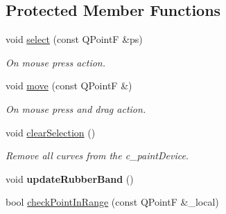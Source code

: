 \subsection*{Protected Member Functions}
\begin{DoxyCompactItemize}
\item 
\mbox{\label{classLineTool_a0262637a5a466947883468e740fda29c}} 
void \mbox{\hyperlink{classLineTool_a0262637a5a466947883468e740fda29c}{select}} (const Q\+PointF \&ps)
\begin{DoxyCompactList}\small\item\em On mouse press action. \end{DoxyCompactList}\item 
\mbox{\label{classLineTool_a02c8004d82d2f59edf4b685200cd834d}} 
void \mbox{\hyperlink{classLineTool_a02c8004d82d2f59edf4b685200cd834d}{move}} (const Q\+PointF \&)
\begin{DoxyCompactList}\small\item\em On mouse press and drag action. \end{DoxyCompactList}\item 
\mbox{\label{classLineTool_a53f84590f85e08426fe2d6bd39482555}} 
void \mbox{\hyperlink{classLineTool_a53f84590f85e08426fe2d6bd39482555}{clear\+Selection}} ()
\begin{DoxyCompactList}\small\item\em Remove all curves from the c\+\_\+paint\+Device. \end{DoxyCompactList}\item 
\mbox{\label{classLineTool_a2a58180a5668ea71ce8411fd39ff5361}} 
void {\bfseries update\+Rubber\+Band} ()
\item 
bool \mbox{\hyperlink{classTool_a81244366dc1b9f55465ed6f37b81033c}{check\+Point\+In\+Range}} (const Q\+PointF \&\+\_\+local)
\end{DoxyCompactItemize}
